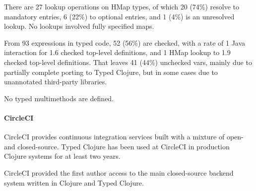 There are 27 lookup operations on HMap types, of which 20 (74\%) resolve to
mandatory entries, 6 (22\%) to optional entries,
and 1 (4\%) is an unresolved lookup. 
No lookups involved fully specified maps.

From 93  expressions in typed code, 52 (56\%) are checked,
with a rate of 1
Java interaction for 1.6 checked top-level definitions, and
1 HMap lookup to 1.9 checked top-level definitions.
That leaves 41 (44\%) unchecked vars, mainly due to partially complete 
porting to Typed Clojure, but in some cases due to unannotated third-party 
libraries.

No typed multimethods are defined.

\paragraph{CircleCI}
CircleCI %
provides continuous integration services built with a mixture of open-
and closed-source.
Typed Clojure has been used at CircleCI in production Clojure systems for at least two years.

CircleCI provided the first author access to the main closed-source backend system written in Clojure
and Typed Clojure.

%

